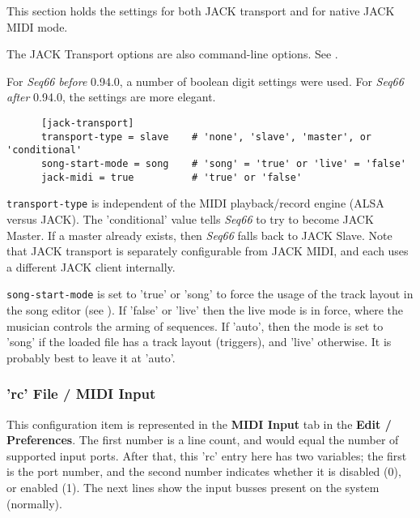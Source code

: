    This section holds the settings for both JACK transport and for native JACK
   MIDI mode.

   The JACK Transport options are also command-line options.
   See .

   For \textsl{Seq66} \textsl{before} 0.94.0, a number of boolean digit settings
   were used.
   For \textsl{Seq66} \textsl{after} 0.94.0, the settings are more elegant.

   \begin{verbatim}
      [jack-transport]
      transport-type = slave    # 'none', 'slave', 'master', or 'conditional'
      song-start-mode = song    # 'song' = 'true' or 'live' = 'false'
      jack-midi = true          # 'true' or 'false'
   \end{verbatim}

   \texttt{transport-type} is independent of the MIDI playback/record engine
   (ALSA versus JACK). The 'conditional' value tells \textsl{Seq66} to try to
   become JACK Master.  If a master already exists, then \textsl{Seq66} falls
   back to JACK Slave.
   Note that JACK transport is separately configurable from
   JACK MIDI, and each uses a different JACK client internally.

   \texttt{song-start-mode} is set to 'true' or 'song' to force the usage of the
   track layout in the song editor (see ).
   If 'false' or 'live' then the live mode is in force, where the musician
   controls the arming of sequences.
   If 'auto', then the mode is set to 'song' if the loaded file has
   a track layout (triggers), and 'live' otherwise.
   It is probably best to leave it at 'auto'.

\subsubsection{'rc' File / MIDI Input}
\label{subsubsec:configuration_rc_midi_input}

   This configuration item is represented in the
   \textbf{MIDI Input} tab in the \textbf{Edit / Preferences}.
   The first number is a line count, and would equal the number of
   supported input ports.
   After that, this 'rc' entry here has two variables;
   the first is the port number,
   and the second number indicates whether it is disabled (0), or enabled (1).
   The next lines show the input busses present on the system (normally).


